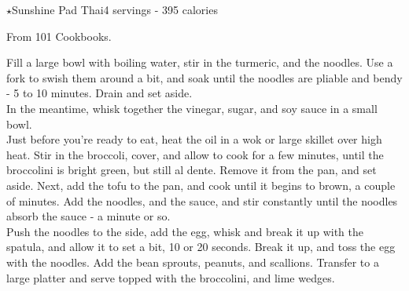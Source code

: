 \begin{recipe}{\texorpdfstring{$\star$}{str}Sunshine Pad Thai}{4 servings - 395 calories}{}

\freeform From 101 Cookbooks.


Fill a large bowl with boiling water, stir in the turmeric, and the noodles. Use a fork to swish them around a bit, and soak until the noodles are pliable and bendy - 5 to 10 minutes. Drain and set aside.\\

In the meantime, whisk together the vinegar, sugar, and soy sauce in a small bowl.\\

Just before you're ready to eat, heat the oil in a wok or large skillet over high heat. Stir in the broccoli, cover, and allow to cook for a few minutes, until the broccolini is bright green, but still al dente. Remove it from the pan, and set aside. Next, add the tofu to the pan, and cook until it begins to brown, a couple of minutes. Add the noodles, and the sauce, and stir constantly until the noodles absorb the sauce - a minute or so.\\

Push the noodles to the side, add the egg, whisk and break it up with the spatula, and allow it to set a bit, 10 or 20 seconds. Break it up, and toss the egg with the noodles. Add the bean sprouts, peanuts, and scallions. Transfer to a large platter and serve topped with the broccolini, and lime wedges.
\end{recipe}